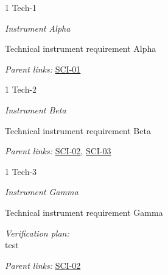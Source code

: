 \begin{frame}{1 Tech-1}
\protect\hypertarget{Tech-1}{}

\emph{Instrument Alpha}

Technical instrument requirement Alpha

\emph{Parent links:} \href{L2.html\#SCI-01}{SCI-01}

\end{frame}

\begin{frame}{1 Tech-2}
\protect\hypertarget{Tech-2}{}

\emph{Instrument Beta}

Technical instrument requirement Beta

\emph{Parent links:} \href{L2.html\#SCI-02}{SCI-02},
\href{L2.html\#SCI-03}{SCI-03}

\end{frame}

\begin{frame}{1 Tech-3}
\protect\hypertarget{Tech-3}{}

\emph{Instrument Gamma}

Technical instrument requirement Gamma

\emph{Verification plan:}\\
test

\emph{Parent links:} \href{L2.html\#SCI-02}{SCI-02}

\end{frame}
